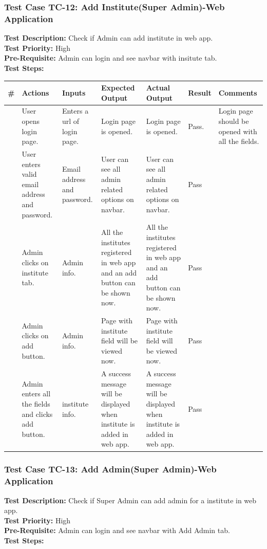 \documentclass[12pt]{article}
\begin{document}
\subsubsection{Test Case TC-12: Add Institute(Super Admin)-Web Application}
\textbf{Test Description: } Check if Admin can add institute in web app. \\
\textbf{Test Priority: } High \\
\textbf{Pre-Requisite: } Admin can login and see navbar with insitute tab. \\
\textbf{Test Steps: }
\begin{longtable}{ |>{\raggedright\arraybackslash} p{0.7cm} | >{\raggedright\arraybackslash}p{2cm}|>{\raggedright\arraybackslash} p{2cm} |>{\raggedright\arraybackslash} p{2.5cm} |>{\raggedright\arraybackslash} p{2.5cm} |>{\raggedright\arraybackslash} p{1.3cm} |>{\raggedright\arraybackslash} p{2.5cm} | } 
\hline
\textbf{\#}
& \textbf{Actions} 
& \textbf{Inputs}
& \textbf{Expected Output} 
& \textbf{Actual Output} 
& \textbf{Result} 
& \textbf{Comments} 
\\ 
\hline
1
& User opens login page. 
& Enters a url of login page.
& Login page is opened.
& Login page is opened.
& Pass.
& Login page should be opened with all the fields.
\\ 
\hline
2 
& User enters valid email address and password.
& Email address and password.
& User can see all admin related options on navbar.
& User can see all admin related options on navbar. 
& Pass
&  
\\ 
\hline
3
& Admin clicks on institute tab.
& Admin info.
& All the institutes registered in web app and an add button can be shown now.
& All the institutes registered in web app and an add button can be shown now. 
& Pass
&  
\\ 
\hline
4
& Admin clicks on add button.
& Admin info.
& Page with institute field will be viewed now.
& Page with institute field will be viewed now. 
& Pass
&  
\\ 
\hline
5
& Admin enters all the fields and clicks add button.
& institute info.
& A success message will be displayed when institute is added in web app.
& A success message will be displayed when institute is added in web app. 
& Pass
&  
\\ 
\hline
\end{longtable}


\subsubsection{Test Case TC-13: Add Admin(Super Admin)-Web Application}
\textbf{Test Description: } Check if Super Admin can add admin for a institute in web app. \\
\textbf{Test Priority: } High \\
\textbf{Pre-Requisite: } Admin can login and see navbar with Add Admin tab. \\
\textbf{Test Steps: }
\end{document}
